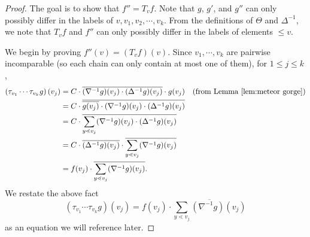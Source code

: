 \documentclass[ALCO,ThmDefs,Unicode,epreuves]{cedram}
\newcommand{\down}{\nabla}
\newcommand{\up}{\Delta}
\begin{document}
\begin{proof}
The goal is to show that $f''=T_v f$.
Note that $g$, $g'$, and $g''$ can only possibly differ in the labels of $v,v_1,v_2,\cdots,v_k$. From the definitions of $\Theta$ and $\up^{-1}$, we note that
$T_v f$ and $f''$ can only possibly differ in the labels of elements $\leq v$.

We begin by proving $f''(v)=(T_v f)(v)$. Since $v_1,\cdots,v_k$ are pairwise incomparable
(so each chain can only contain at most one of them), for $1\leq j\leq k$,
\begin{align*}
\left(\tau_{v_1}\cdots \tau_{v_k} g\right)(v_j)
&=
C\cdot \overline{(\down^{-1}g)(v_j)\cdot(\up^{-1}g)(v_j)}\cdot g(v_j)
&\text{(from Lemma~\ref{lem:meteor gorge})}\\
&=
C\cdot \overline{\overline{g(v_j)}\cdot(\down^{-1}g)(v_j)\cdot(\up^{-1}g)(v_j)}\\
&=C\cdot \overline{\sum\limits_{y\lessdot v_j}(\down^{-1}g)(v_j)\cdot(\up^{-1}g)(v_j)}\\
&=C\cdot \overline{(\up^{-1}g)(v_j)}\cdot\overline{\sum\limits_{y\lessdot v_j}(\down^{-1}g)(v_j)}\\
&=f(v_j)\cdot\overline{\sum\limits_{y\lessdot v_j}(\down^{-1}g)(v_j)}.
\end{align*}
We restate the above fact
\begin{equation}\label{eq:the lost city}
 \left(\tau_{v_1}\cdots \tau_{v_k} g\right)(v_j)
 = f(v_j)\cdot\overline{\sum\limits_{y\lessdot v_j}(\down^{-1}g)(v_j)}
\end{equation}
as an equation we will reference later.


\end{proof}
\end{document}
